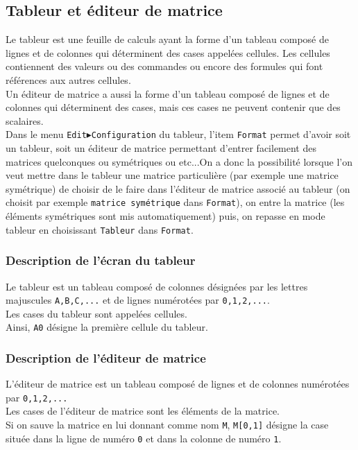 \documentclass[a4paper,11pt]{book}
\begin{document}
\subsection{Tableur et \'editeur de matrice}
Le tableur est une feuille de calculs ayant la forme d'un tableau compos\'e de 
lignes et de colonnes qui d\'eterminent des cases appel\'ees cellules. Les 
cellules contiennent des valeurs ou des commandes ou encore des formules 
qui font r\'ef\'erences aux autres cellules.\\
Un \'editeur de matrice a aussi la forme d'un tableau compos\'e de 
lignes et de colonnes qui d\'eterminent des cases, mais ces cases ne peuvent 
contenir que des scalaires.\\
Dans le menu {\tt Edit$\blacktriangleright$Configuration} du tableur, l'item 
{\tt Format} permet d'avoir soit un tableur, soit un \'editeur de matrice 
permettant d'entrer facilement des matrices quelconques ou sym\'etriques ou 
etc...On a donc la possibilit\'e lorsque l'on veut mettre dans le tableur une 
matrice particuli\`ere (par exemple une matrice sym\'etrique) de choisir de le 
faire dans l'\'editeur de matrice associ\'e au tableur (on choisit par exemple 
{\tt matrice sym\'etrique} dans {\tt Format}), on entre la matrice 
(les \'el\'ements sym\'etriques sont mis automatiquement) puis, on repasse en 
mode tableur en choisissant {\tt Tableur} dans {\tt Format}.
\subsubsection{Description de l'\'ecran du tableur}
Le tableur est un tableau compos\'e de colonnes d\'esign\'ees par 
les lettres majuscules {\tt A,B,C,...} et de lignes num\'erot\'ees par 
{\tt 0,1,2,...}.\\
Les cases du tableur sont appel\'ees cellules.\\
Ainsi, {\tt A0} d\'esigne la premi\`ere  cellule du tableur.

\subsubsection{Description de l'\'editeur de matrice}
L'\'editeur de matrice est un tableau compos\'e de lignes et de colonnes 
num\'erot\'ees par {\tt 0,1,2,...}\\
Les cases de l'\'editeur de matrice sont les \'el\'ements de la matrice.\\
Si on sauve la matrice en lui donnant comme nom {\tt M}, {\tt M[0,1]}
d\'esigne la case situ\'ee dans la ligne de num\'ero {\tt 0} et dans la colonne
de num\'ero {\tt 1}.
\end{document}
